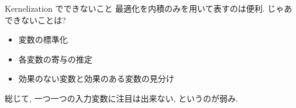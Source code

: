 \documentclass[dvipdfmx,8pt]{beamer}
\begin{document}
  \begin{frame}{Kernelization でできないこと}
    最適化を内積のみを用いて表すのは便利. じゃあできないことは?
    \begin{itemize}
      \item 変数の標準化
      \item 各変数の寄与の推定
      \item 効果のない変数と効果のある変数の見分け
    \end{itemize}
    総じて, 一つ一つの入力変数に注目は出来ない, というのが弱み. 
  \end{frame}

\end{document}
